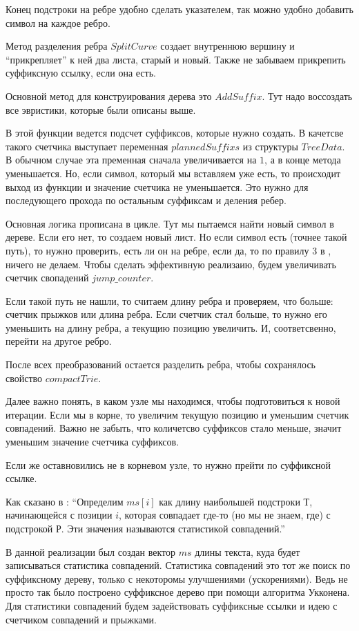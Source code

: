 Конец подстроки на ребре удобно сделать указателем, так можно удобно добавить символ на каждое ребро.

Метод разделения ребра $SplitCurve$ создает внутреннюю вершину и \enquote{прикрепляет} к ней два листа, старый и новый.
Также не забываем прикрепить суффиксную ссылку, если она есть.

Основной метод для конструирования дерева это $AddSuffix$. Тут надо воссоздать все эвристики, которые были описаны выше. 

В этой функции ведется подсчет суффиксов, которые нужно создать. В качетсве такого счетчика выступает переменная $plannedSuffixs$ 
из структуры $TreeData$. В обычном случае эта пременная сначала увеличивается на $1$, а в конце метода уменьшается. Но, если символ, 
который мы вставляем уже есть, то происходит выход из функции и значение счетчика не уменьшается. Это нужно для последующего прохода 
по остальным суффиксам и деления ребер.

Основная логика прописана в цикле. Тут мы пытаемся найти новый символ в дереве. Если его нет, то создаем новый лист.
Но если символ есть (точнее такой путь), то нужно проверить, есть ли он на ребре, если да, то по правилу 3 в \cite{Gasfild}, ничего не делаем. 
Чтобы сделать эффективную реализаию, будем увеличивать счетчик свопадений $jump\_counter$.

Если такой путь не нашли, то считаем длину ребра и проверяем, что больше: счетчик прыжков или длина ребра. Если счетчик стал больше, 
то нужно его уменьшить на длину ребра, а текущию позицию увеличить. И, соответсвенно, перейти на другое ребро.

После всех преобразований остается разделить ребра, чтобы сохранялось свойство $compact Trie$.

Далее важно понять, в каком узле мы находимся, чтобы подготовиться к новой итерации. Если мы в корне, 
то увеличим текущую позицию и уменьшим счетчик совпадений. Важно не забыть, что количетсво суффиксов стало меньше, 
значит уменьшим значение счетчика суффиксов.

Если же оставновились не в корневом узле, то нужно прейти по суффиксной ссылке.


Как сказано в \cite{Gasfild}: \enquote{Определим $ms[i]$ как длину наибольшей подстроки $Т$, начинающейся с позиции $i$, 
которая совпадает где-то (но мы не знаем, где) с подстрокой $Р$. Эти значения называются статистикой совпадений.}

В данной реализации был создан вектор $ms$ длины текста, куда будет записываться статистика совпадений. 
Статистика совпадений это тот же поиск по суффиксному дереву, только с некоторомы улучшениями (ускорениями). Ведь не просто так
было построено суффиксное дерево при помощи алгоритма Укконена. Для статистики совпадений будем задействовать суффиксные ссылки 
и идею с счетчиком совпадений и прыжками.

